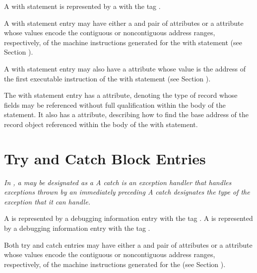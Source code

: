 A with statement is represented by a
with the tag \DWTAGwithstmtTARG.

A with statement entry may have either a 
\DWATlowpc{} and
\DWAThighpc{} pair of attributes 
or 
a \DWATranges{} attribute
whose values encode the contiguous or non\dash contiguous address
ranges, respectively, of the machine instructions generated
for the with statement 
(see Section ).

A 
\hypertarget{chap:DWATentrypcofwithstmt}{}
with statement entry may also have 
a 
\DWATentrypc{} attribute
whose value is the address of the first executable instruction
of the with statement (see 
Section ).

The with statement entry has 
a \DWATtype{} attribute, denoting
the type of record whose fields may be referenced without full
qualification within the body of the statement. It also has
a \DWATlocation{} attribute, describing how to find the base
address of the record object referenced within the body of
the with statement.

\section{Try and Catch Block Entries}
\label{chap:tryandcatchblockentries}
\textit{In , a  may be 
designated as a  
A catch  is an exception handler that 
handles exceptions thrown by an immediately preceding 
A catch  
designates the type of the exception that it can handle.}

A  is represented 
by a debugging information entry
with the tag \DWTAGtryblockTARG.  
A  is represented by
a debugging information entry
with the tag \DWTAGcatchblockTARG.

Both try and catch  entries may have either a
\DWATlowpc{} and 
\DWAThighpc{} pair of attributes 
or 
a
\DWATranges{} attribute 
whose values encode the contiguous
or non\dash contiguous address ranges, respectively, of the
machine instructions generated for the 
(see Section ).

